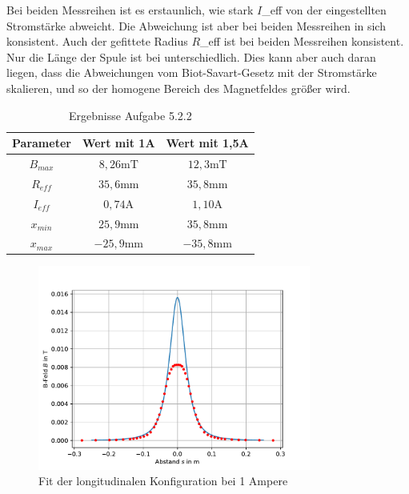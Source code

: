 \documentclass[11pt, a4paper]{article}
\begin{document}
    Bei beiden Messreihen ist es erstaunlich, wie stark $I$_{eff} von der eingestellten Stromstärke abweicht. Die Abweichung ist aber bei beiden Messreihen in sich konsistent. Auch der gefittete Radius $R$_{eff} ist bei beiden Messreihen konsistent. Nur die Länge der Spule ist bei unterschiedlich. Dies kann aber auch daran liegen, dass die Abweichungen vom Biot-Savart-Gesetz mit der Stromstärke skalieren, und so der homogene Bereich des Magnetfeldes größer wird.
    \begin{table}[h]
        \centering
        \begin{tabular}{c | c | c}
            \textbf{Parameter} & \textbf{Wert mit 1A} & \textbf{Wert mit 1,5A} \\
            \hline
            $B_{max}$ & $8,26 \si{\milli\tesla}$ & $12,3 \si{\milli\tesla}$ \\
            $R_{eff}$ & $35,6 \si{\milli\metre}$ & $35,8 \si{\milli\metre}$ \\
            $I_{eff}$ & $0,74 \si{\ampere}$ & $1,10 \si{\ampere}$ \\
            $x_{min}$ & $25,9 \si{\milli\meter}$ & $35,8 \si{\milli\meter}$ \\
            $x_{max}$ & $-25,9 \si{\milli\meter}$ & $-35,8 \si{\milli\meter}$ \\
        \end{tabular}
        \caption{Ergebnisse Aufgabe 5.2.2}
        \label{tab:fit}
    \end{table}

    \begin{figure}
        \centering
        \includegraphics[width=0.8\textwidth]{fit1.pdf}
        \caption{Fit der longitudinalen Konfiguration bei 1 Ampere}
        \label{fig:longfit1a}
    \end{figure}
\end{document}
